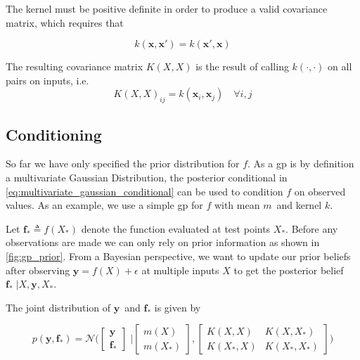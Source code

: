 The kernel must be positive definite in order to produce a valid covariance matrix, which requires that

\begin{equation}
    k(\boldsymbol{x}, \boldsymbol{x}') = k(\boldsymbol{x}', \boldsymbol{x})
\end{equation}

The resulting covariance matrix $K(X, X)$ is the result of calling $k(\cdot, \cdot)$ on all pairs on inputs, i.e.
\begin{equation}
    K(X, X)_{ij} = k(\boldsymbol{x}_i, \boldsymbol{x}_j) \quad \forall i, j
\end{equation}

\subsection{Conditioning}
So far we have only specified the prior distribution for $f$. As a \acrshort{gp} is by definition a multivariate Gaussian Distribution, the posterior conditional in \cref{eq:multivariate_gaussian_conditional} can be used to condition $f$ on observed values. 
As an example, we use a simple \acrshort{gp} for $f$ with mean $m$ and kernel $k$.

Let $\boldsymbol{f}_* \triangleq f(X_*)$ denote the function evaluated at test points $X_*$. Before any observations are made we can only rely on prior information as shown in \cref{fig:gp_prior}. From a Bayesian perspective, we want to update our prior beliefs after observing $\boldsymbol{y} = f(X) + \epsilon$ at multiple inputs $X$ to get the posterior belief $\boldsymbol{f}_* \; | X, \boldsymbol{y}, X_*$.

The joint distribution of $\boldsymbol{y}$ and $\boldsymbol{f}_*$ is given by 

\begin{equation}
    p(\boldsymbol{y}, \boldsymbol{f}_*) = \mathcal{N}\bigg(\begin{bmatrix}
        \boldsymbol{y} \\ \boldsymbol{f}_*
    \end{bmatrix} \; \bigg| \begin{bmatrix}
        m(X) \\ m(X_*)
    \end{bmatrix},  \begin{bmatrix}
        K(X, X) & K(X, X_*) \\ K(X_*, X) & K(X_*, X_*)
    \end{bmatrix}\bigg)
\end{equation}

